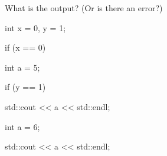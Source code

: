 What is the output? (Or is there an error?)



\begin{console}

int x = 0, y = 1;



if (x == 0)

{    

     int a = 5;

     if (y == 1)

     {    

          std::cout << a << std::endl;

          int a = 6;

          std::cout << a << std::endl;

     }

}

\end{console}


